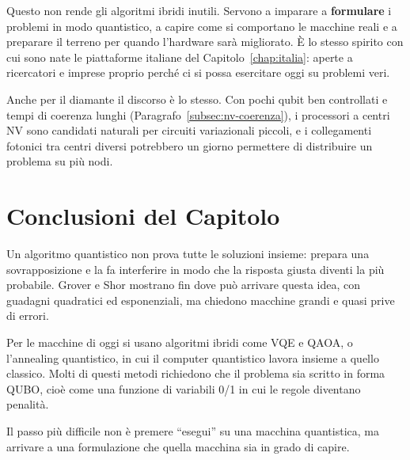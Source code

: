 Questo non rende gli algoritmi ibridi inutili. Servono a imparare a
\textbf{formulare} i problemi in modo quantistico, a capire come si comportano
le macchine reali e a preparare il terreno per quando l'hardware sarà
migliorato. È lo stesso spirito con cui sono nate le piattaforme italiane del
Capitolo~\ref{chap:italia}: aperte a ricercatori e imprese proprio perché ci
si possa esercitare oggi su problemi veri.

Anche per il diamante il discorso è lo stesso. Con pochi qubit ben controllati
e tempi di coerenza lunghi (Paragrafo~\ref{subsec:nv-coerenza}), i processori
a centri NV sono candidati naturali per circuiti variazionali piccoli, e i
collegamenti fotonici tra centri diversi potrebbero un giorno permettere di
distribuire un problema su più nodi.

\section{Conclusioni del Capitolo}
\label{sec:alg-conclusioni}

Un algoritmo quantistico non prova tutte le soluzioni insieme: prepara una
sovrapposizione e la fa interferire in modo che la risposta giusta diventi la
più probabile. Grover e Shor mostrano fin dove può arrivare questa idea, con
guadagni quadratici ed esponenziali, ma chiedono macchine grandi e quasi prive
di errori.

Per le macchine di oggi si usano algoritmi ibridi come VQE e QAOA, o
l'annealing quantistico, in cui il computer quantistico lavora insieme a quello
classico. Molti di questi metodi richiedono che il problema sia scritto in
forma QUBO, cioè come una funzione di variabili 0/1 in cui le regole diventano
penalità.

Il passo più difficile non è premere ``esegui'' su una
macchina quantistica, ma arrivare a una formulazione che quella macchina sia in
grado di capire.
